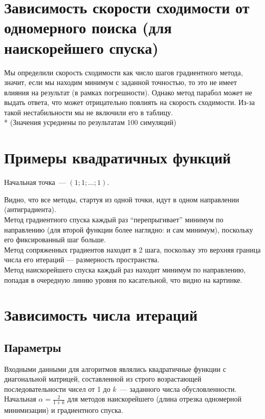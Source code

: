 \documentclass[russian, english]{article}
\begin{document}
\section{Зависимость скорости сходимости от одномерного поиска (для наискорейшего спуска)}
Мы определили скорость сходимости как число шагов градиентного метода, значит, если мы находим минимум с заданной точностью, то это не имеет влияния на результат (в рамках погрешности). Однако метод парабол может не выдать ответа, что может отрицательно повлиять на скорость сходимости. Из-за такой нестабильности мы не включили его в таблицу.
\\*
(Значения усреднены по результатам 100 симуляций)

\section{Примеры квадратичных функций}
Начальная точка~--- $(1;1;\dots;1)$.
\par
\noindent{}
\newpage
\noindent{}
\newpage
\noindent{}
\par
Видно, что все методы, стартуя из одной точки, идут в одном направлении (антиградиента). \\
Метод градиентного спуска каждый раз ``перепрыгивает'' минимум по направлению (для второй функции более наглядно: и сам минимум), поскольку его фиксированный шаг больше. \\
Метод сопряженных градиентов находит в 2 шага, поскольку это верхняя граница числа его итераций --- размерность пространства. \\
Метод наискорейшего спуска каждый раз находит минимум по направлению, попадая в очередную линию уровня по касательной, что видно на картинке.
\section{Зависимость числа итераций}
\subsection{Параметры}

Входными данными для алгоритмов являлись квадратичные функции с диагональной матрицей, составленной из строго возрастающей последовательности чисел от 1 до $k$~--- заданного числа обусловленности. Начальная $\alpha=\frac{2}{1+k}$ для методов наискорейшего (длина отрезка одномерной минимизации) и градиентного спуска.
\end{document}
